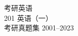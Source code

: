 

\pagestyle{empty}
\rule{0pt}{1pt}
\vfil
\begin{center}
	\heiti {}
	考研英语\\ 
		201  英语（一）\\
		考研真题集 2001--2023 \rule{0pt}{1.7em}
\end{center}

\vfil
